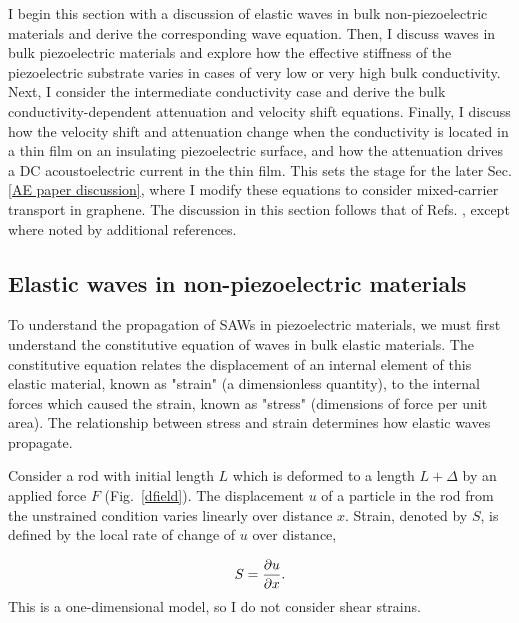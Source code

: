 \documentclass[double,12pt,1in,seploa]{beavtex}
\let\Oldsubsection\subsection
\renewcommand{\subsection}{\FloatBarrier\Oldsubsection}
\begin{document}
I begin this section with a discussion of elastic waves in bulk non-piezoelectric materials and derive the corresponding wave equation. Then, I discuss waves in bulk piezoelectric materials and explore how the effective stiffness of the piezoelectric substrate varies in cases of very low or very high bulk conductivity. Next, I consider the intermediate conductivity case and derive the bulk conductivity-dependent attenuation and velocity shift equations. Finally, I discuss how the velocity shift and attenuation change when the conductivity is located in a thin film on an insulating piezoelectric surface, and how the attenuation drives a DC acoustoelectric current in the thin film. This sets the stage for the later Sec. \ref{AE paper discussion}, where I modify these equations to consider mixed-carrier transport in graphene. The discussion in this section follows that of Refs. \cite{datta_surface_1986, weinreich_acoustodynamic_1956, hutson_elastic_1962, wixforth_surface_1989}, except where noted by additional references.

\subsection{Elastic waves in non-piezoelectric materials}
To understand the propagation of SAWs in piezoelectric materials, we must first understand the constitutive equation of waves in bulk elastic materials. The constitutive equation relates the displacement of an internal element of this elastic material, known as "strain" (a dimensionless quantity), to the internal forces which caused the strain, known as "stress" (dimensions of force per unit area). The relationship between stress and strain determines how elastic waves propagate. 

Consider a rod with initial length $L$ which is deformed to a length $L + \Delta$ by an applied force $F$ (Fig.\ \ref{dfield}). The displacement $u$ of a particle in the rod from the unstrained condition varies linearly over distance $x$. Strain, denoted by $S$, is defined by the local rate of change of $u$ over distance, 

\begin{equation}
    S = \pdv{u}{x}. \label{strain-displacement equation}
\end{equation}
This is a one-dimensional model, so I do not consider shear strains.
\end{document}
